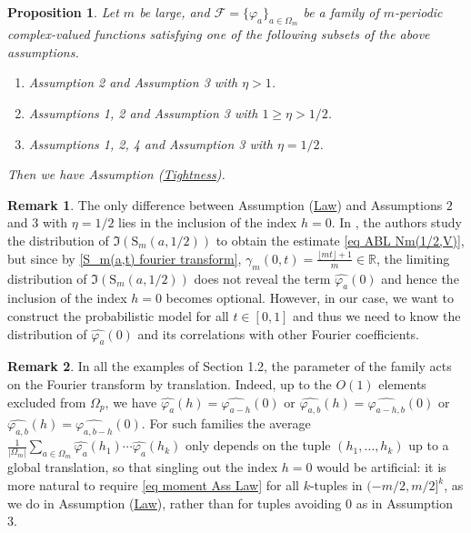 \documentclass[12pt]{amsart}
\newtheorem{pro}[thm]{Proposition}
\theoremstyle{definition}
\newtheorem{rem}{Remark}
\numberwithin{equation}{section}
\numberwithin{equation}{section}
\def\Fcal{\mathcal{F}}
\def\R{\mathbb{R}}
\def\S{\mathrm{S}}
\begin{document}
\begin{pro}\label{Pro Assumptions implication}
Let $m$ be large, and $\Fcal = \{\varphi_a\}_{a\in\Omega_m}$ be a family of $m$-periodic complex-valued functions satisfying one of the following subsets of the above assumptions.
\begin{enumerate}[label=\Alph*]
    \item Assumption 2 and Assumption 3 with $\eta>1$.

    \item Assumptions 1, 2 and Assumption 3 with $1\geq \eta>1/2$.

    \item Assumptions 1, 2, 4 and Assumption 3 with $ \eta=1/2$.
\end{enumerate}
Then we have Assumption (\hyperlink{Ass Tightness}{Tightness}).
\end{pro}

\begin{rem} 
The only difference between Assumption (\hyperlink{Ass Law}{Law}) and Assumptions $2$ and $3$ with $\eta = 1/2$ lies in the inclusion of the index $h=0$.
In \cite{ABL21}, the authors study the distribution of $\Im (\S_m(a,1/2))$ to obtain the estimate \eqref{eq ABL Nm(1/2,V)}, but
since by \eqref{S_m(a,t) fourier transform}, $\gamma_m(0,t) = \frac{\lfloor mt \rfloor+1}{m}\in \R$, the limiting distribution of $\Im (\S_m(a,1/2))$ does not reveal the term $\widehat{\varphi_a}(0)$ and hence the inclusion of the index $h=0$ becomes optional.
However, in our case, we want to construct the probabilistic model for all $t\in [0,1]$ and thus we need to know the  distribution of $\widehat{\varphi_a}(0)$ and its correlations with other Fourier coefficients.
\end{rem}

\begin{rem} \label{rem hat varphi_a(h) = hat varphi a-h(0)}
In all the examples of Section 1.2, the parameter of the family acts on the Fourier
transform by translation. Indeed, up to the $O(1)$ elements excluded from
$\Omega_p$, we have $\widehat{\varphi_a}(h) = \widehat{\varphi_{a-h}}(0)$ or $\widehat{\varphi_{a,b}}(h) = \widehat{\varphi_{a-h,b}}(0)$
or $\widehat{\varphi_{a,b}}(h) = \widehat{\varphi_{a,b-h}}(0)$. For such families the average
$\frac{1}{|\Omega_m|}\sum_{a \in \Omega_m} \widehat{\varphi_a}(h_1) \cdots
\widehat{\varphi_a}(h_k)$ only depends on the tuple $(h_1, \dots, h_k)$ up to a
global translation, so that singling out the index $h = 0$ would be artificial:
it is more natural to require \eqref{eq moment Ass Law} for all $k$-tuples in $(-m/2, m/2]^k$, as we do
in Assumption (\hyperlink{Ass Law}{Law}), rather than for tuples avoiding $0$ as in Assumption 3.
\end{rem}
\end{document}
